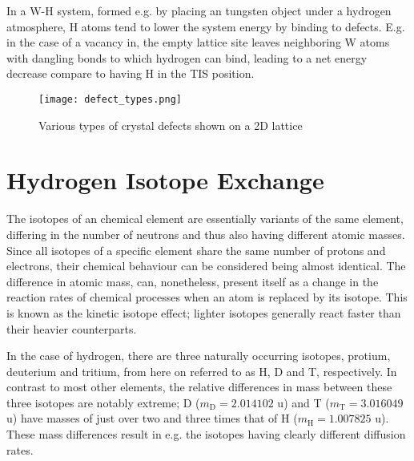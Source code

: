 In a W-H system, formed e.g. by placing an tungsten object under a hydrogen atmosphere, H atoms tend to lower the system energy by binding to defects. E.g. in the case of a vacancy in, the empty lattice site leaves neighboring W atoms with dangling bonds to which hydrogen can bind, leading to a net energy decrease compare to having H in the TIS position.

\begin{figure}[!ht]
\center
\texttt{[image: defect\_types.png]}
\caption{Various types of crystal defects shown on a 2D lattice}
\label{Fig:defect_types}
\end{figure}


\section{Hydrogen Isotope Exchange}

The isotopes of an chemical element are essentially variants of the same element, differing in the number of neutrons and thus also having different atomic masses. Since all isotopes of a specific element share the same number of protons and electrons, their chemical behaviour can be considered being almost identical. The difference in atomic mass,  can, nonetheless, present itself as a change in the reaction rates of chemical processes when an atom is replaced by its isotope. This is known as the kinetic isotope effect; lighter isotopes generally react faster than their heavier counterparts. \cite{atkins2006atkins}

In the case of hydrogen, there are three naturally occurring isotopes, protium, deuterium and tritium, from here on referred to as H, D and T, respectively. In contrast to most other elements, the relative differences in mass between these three isotopes are notably extreme; D ($m_{\text{D}}=2.014102$ u) and T ($m_{\text{T}}=3.016049$ u) have masses of just over two and three times that of H ($m_{\text{H}}=1.007825$ u). These mass differences result in e.g. the isotopes having clearly different diffusion rates.


